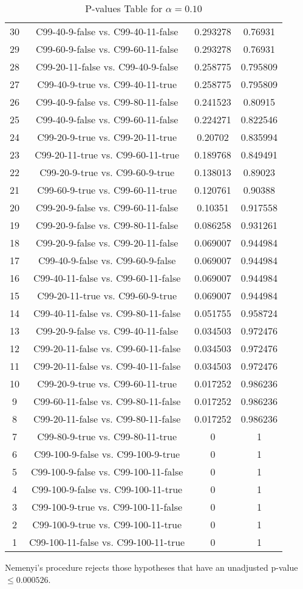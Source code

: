 \documentclass[a4paper,10pt]{article}
\begin{document}
\begin{landscape}
\begin{table}[!htp]
\begin{tabular}{cccc}
30&C99-40-9-false vs. C99-40-11-false&0.293278&0.76931\\
29&C99-60-9-false vs. C99-60-11-false&0.293278&0.76931\\
28&C99-20-11-false vs. C99-40-9-false&0.258775&0.795809\\
27&C99-40-9-true vs. C99-40-11-true&0.258775&0.795809\\
26&C99-40-9-false vs. C99-80-11-false&0.241523&0.80915\\
25&C99-40-9-false vs. C99-60-11-false&0.224271&0.822546\\
24&C99-20-9-true vs. C99-20-11-true&0.20702&0.835994\\
23&C99-20-11-true vs. C99-60-11-true&0.189768&0.849491\\
22&C99-20-9-true vs. C99-60-9-true&0.138013&0.89023\\
21&C99-60-9-true vs. C99-60-11-true&0.120761&0.90388\\
20&C99-20-9-false vs. C99-60-11-false&0.10351&0.917558\\
19&C99-20-9-false vs. C99-80-11-false&0.086258&0.931261\\
18&C99-20-9-false vs. C99-20-11-false&0.069007&0.944984\\
17&C99-40-9-false vs. C99-60-9-false&0.069007&0.944984\\
16&C99-40-11-false vs. C99-60-11-false&0.069007&0.944984\\
15&C99-20-11-true vs. C99-60-9-true&0.069007&0.944984\\
14&C99-40-11-false vs. C99-80-11-false&0.051755&0.958724\\
13&C99-20-9-false vs. C99-40-11-false&0.034503&0.972476\\
12&C99-20-11-false vs. C99-60-11-false&0.034503&0.972476\\
11&C99-20-11-false vs. C99-40-11-false&0.034503&0.972476\\
10&C99-20-9-true vs. C99-60-11-true&0.017252&0.986236\\
9&C99-60-11-false vs. C99-80-11-false&0.017252&0.986236\\
8&C99-20-11-false vs. C99-80-11-false&0.017252&0.986236\\
7&C99-80-9-true vs. C99-80-11-true&0&1\\
6&C99-100-9-false vs. C99-100-9-true&0&1\\
5&C99-100-9-false vs. C99-100-11-false&0&1\\
4&C99-100-9-false vs. C99-100-11-true&0&1\\
3&C99-100-9-true vs. C99-100-11-false&0&1\\
2&C99-100-9-true vs. C99-100-11-true&0&1\\
1&C99-100-11-false vs. C99-100-11-true&0&1\\
\hline
\end{tabular}
\caption{P-values Table for $\alpha=0.10$}
\end{table}Nemenyi's procedure rejects those hypotheses that have an unadjusted p-value $\le0.000526$.


\end{landscape}
\end{document}
